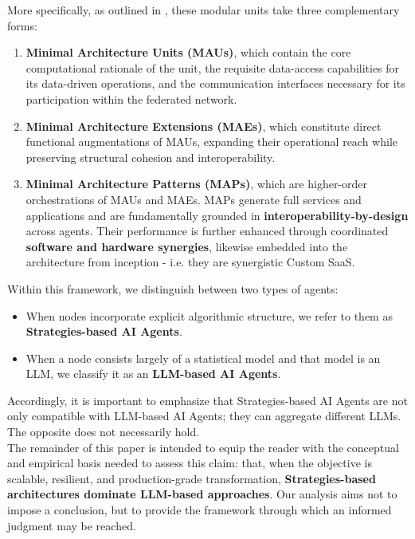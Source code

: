 \documentclass{article}
\begin{document}
More specifically, as outlined in \cite{Data MAPs}, these modular units take three complementary forms:
\begin{enumerate}
    \item \textbf{Minimal Architecture Units (MAUs)}, which contain the core computational rationale of the unit, the requisite data-access capabilities for its data-driven operations, and the communication interfaces necessary for its participation within the federated network.
    \item \textbf{Minimal Architecture Extensions (MAEs)}, which constitute direct functional augmentations of MAUs, expanding their operational reach while preserving structural cohesion and interoperability.
    \item \textbf{Minimal Architecture Patterns (MAPs)}, which are higher-order orchestrations of MAUs and MAEs. MAPs generate full services and applications and are fundamentally grounded in \textbf{interoperability-by-design} across agents. Their performance is further enhanced through coordinated \textbf{software and hardware synergies}, likewise embedded into the architecture from inception - i.e. they are synergistic Custom SaaS.
\end{enumerate}

Within this framework, we distinguish between two types of agents:
\begin{itemize}
    \item When nodes incorporate explicit algorithmic structure, we refer to them as \textbf{Strategies-based AI Agents}.
    \item When a node consists largely of a statistical model and that model is an LLM, we classify it as an \textbf{LLM-based AI Agents}.
\end{itemize}

Accordingly, it is important to emphasize that Strategies-based AI Agents are not only compatible with LLM-based AI Agents; they can aggregate different LLMs. The opposite does not necessarily hold.\\

The remainder of this paper is intended to equip the reader with the conceptual and empirical basis needed to assess this claim: that, when the objective is scalable, resilient, and production-grade transformation, \textbf{Strategies-based architectures dominate LLM-based approaches}. Our analysis aims not to impose a conclusion, but to provide the framework through which an informed judgment may be reached.\\
\end{document}
